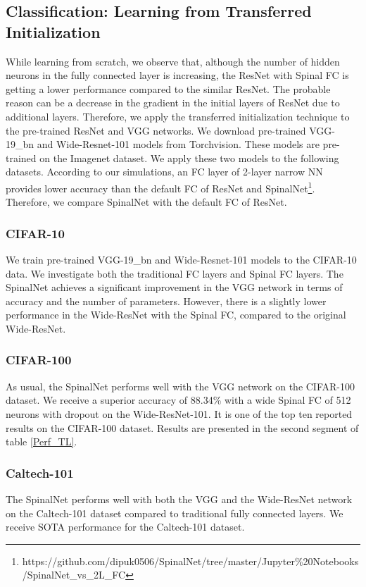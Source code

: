 \documentclass[journal]{IEEEtran}
\begin{document}
\subsection{Classification: Learning from Transferred Initialization}
While learning from scratch, we observe that, although the number of hidden neurons in the fully connected layer is increasing, the ResNet with Spinal FC is getting a lower performance compared to the similar ResNet. The probable reason can be a decrease in the gradient in the initial layers of ResNet due to additional layers. Therefore, we apply the transferred initialization technique to the pre-trained ResNet and VGG networks. We download pre-trained VGG-19\_bn and Wide-Resnet-101 models from Torchvision. These models are pre-trained on the Imagenet dataset. We apply these two models to the following datasets. According to our simulations, an FC layer of 2-layer narrow NN provides lower accuracy than the default FC of ResNet and SpinalNet\footnote{https://github.com/dipuk0506/SpinalNet/tree/master/Jupyter\%20Notebooks /SpinalNet\_vs\_2L\_FC}. Therefore, we compare SpinalNet with the default FC of ResNet.

\subsubsection{CIFAR-10}
We train pre-trained VGG-19\_bn and Wide-Resnet-101 models to the CIFAR-10 data. We investigate both the traditional FC layers and Spinal FC layers. The SpinalNet achieves a significant improvement in the VGG network in terms of accuracy and the number of parameters. However, there is a slightly lower performance in the Wide-ResNet with the Spinal FC, compared to the original Wide-ResNet.

\subsubsection{CIFAR-100}
As usual, the SpinalNet performs well with the VGG network on the CIFAR-100 dataset. We receive a superior accuracy of 88.34\% with a wide Spinal FC of 512 neurons with dropout on the Wide-ResNet-101. It is one of the top ten reported results on the CIFAR-100 dataset. Results are presented in the second segment of table \ref{Perf_TL}.

\subsubsection{Caltech-101}
The SpinalNet performs well with both the VGG and the Wide-ResNet network on the Caltech-101 dataset compared to traditional fully connected layers. We receive SOTA performance for the Caltech-101 dataset.
\end{document}
